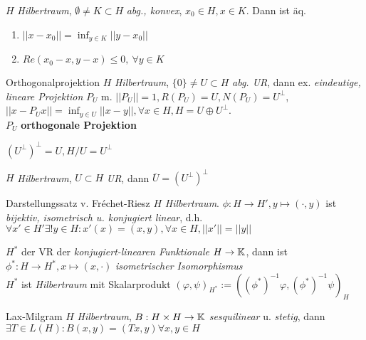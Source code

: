 \begin{lemma}
  $H$ \textit{Hilbertraum}, $\emptyset \neq K\subset H$ \textit{abg., konvex},
  $x_0 \in H, x\in K$. Dann ist äq.
  \begin{enumerate}[label = (\roman*)]
    \item $||x-x_0|| = \inf_{y\in K}||y-x_0||$
    \item $Re(x_0-x,y-x) \leq 0,\ \forall y\in K$
  \end{enumerate}
\end{lemma}

\begin{satz}{Orthogonalprojektion}
  $H$ \textit{Hilbertraum}, $\{0\} \neq U \subset H$ \textit{abg. UR}, dann
  ex. \textit{eindeutige, lineare Projektion} $P_U$ m. $||P_U|| = 1, R(P_U) = U,
  N(P_U)=U^\perp$,\\
  $||x-P_Ux|| = \inf_{y\in U}||x-y||, \forall x\in H, H = U \oplus U^\perp$.\\
  $P_U$ \textbf{orthogonale Projektion}
\end{satz}

\begin{bemerkung}
  $(U^\perp)^\perp = U, H/U = U^\perp$
\end{bemerkung}

\begin{korrolar}
  $H$ \textit{Hilbertraum}, $U\subset H$ \textit{UR},
  dann $\overline{U} = (U^\perp)^\perp$
\end{korrolar}

\begin{satz}{Darstellungssatz v. Fréchet-Riesz}
  $H$ \textit{Hilbertraum}. $\phi:H \to H', y \mapsto (\cdot,y)$ ist
  \textit{bijektiv, isometrisch u. konjugiert linear}, d.h.
  $\forall x' \in H' \exists ! y \in H: x'(x) = (x,y), \forall x \in H,
  ||x'|| = ||y||$
\end{satz}

\begin{bemerkung}
  $H^*$ der VR der \textit{konjugiert-linearen Funktionale} $H\to \mathbb{K}$,
  dann ist $\phi^*:H \to H^*, x\mapsto (x,\cdot)$ \textit{isometrischer
  Isomorphismus}\\
  $H^*$ ist \textit{Hilbertraum} mit Skalarprodukt $(\varphi, \psi)_{H^*} :=
  ((\phi^*)^{-1}\varphi,(\phi^*)^{-1}\psi )_H$
\end{bemerkung}

\begin{satz}{Lax-Milgram}
  $H$ \textit{Hilbertraum}, $B:H \times H \to \mathbb{K}$ \textit{sesquilinear} u.
  \textit{stetig}, dann $\exists T \in L(H):B(x,y)=(Tx,y) \forall x,y \in H$
\end{satz}


